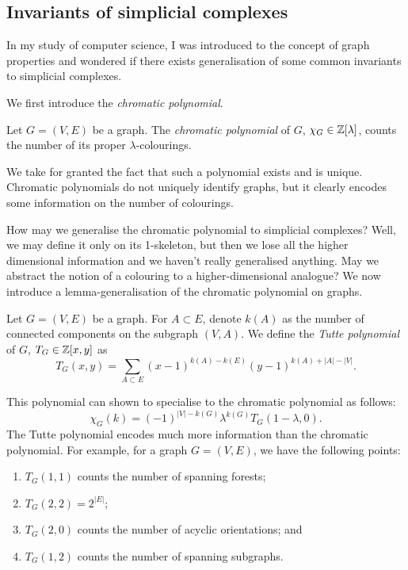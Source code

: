 \subsection*{Invariants of simplicial complexes}

In my study of computer science, I was introduced to the concept of graph properties and wondered if there exists generalisation of some common invariants to simplicial complexes.

We first introduce the \emph{chromatic polynomial}.

\begin{definition}
  Let $G = (V,E)$ be a graph. The \emph{chromatic polynomial} of $G$, $\chi_G \in \mathbb{Z}[\lambda]$, counts the number of its proper $\lambda$-colourings.
\end{definition}

We take for granted the fact that such a polynomial exists and is unique. Chromatic polynomials do not uniquely identify graphs, but it clearly encodes some information on the number of colourings. 

How may we generalise the chromatic polynomial to simplicial complexes? Well, we may define it only on its 1-skeleton, but then we lose all the higher dimensional information and we haven't really generalised anything. May we abstract the notion of a colouring to a higher-dimensional analogue? We now introduce a lemma-generalisation of the chromatic polynomial on graphs. 

\begin{definition}
  Let $G = (V,E)$ be a graph. For $A \subset E$, denote $k(A)$ as the number of connected components on the subgraph $(V,A)$. We define the \emph{Tutte polynomial} of $G$, $T_G \in \mathbb{Z}[x, y]$ as
  \[
    T_G(x,y) = \sum_{A \subset E} (x-1)^{k(A) - k(E)} (y-1)^{k(A) + \lvert A \rvert - \lvert V \rvert}.
  \]
\end{definition}

This polynomial can shown to specialise to the chromatic polynomial as follows:
\[
  \chi_G(k) = (-1)^{\lvert V \rvert - k(G)} \lambda^{k(G)} T_G(1 - \lambda, 0).
\]
The Tutte polynomial encodes much more information than the chromatic polynomial. For example, for a graph $G = (V,E)$, we have the following points:
\begin{enumerate}
  \item $T_G(1,1)$ counts the number of spanning forests;
  \item $T_G(2,2) = 2^{\lvert E \rvert}$;
  \item $T_G(2,0)$ counts the number of acyclic orientations; and
  \item $T_G(1,2)$ counts the number of spanning subgraphs. 
\end{enumerate}

